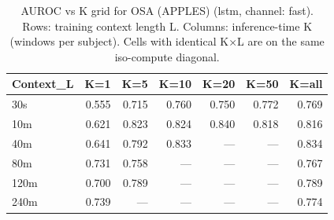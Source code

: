 \begin{table}[ht]
\centering
\caption{AUROC vs K grid for OSA (APPLES) (lstm, channel: fast). Rows: training context length L. Columns: inference-time K (windows per subject). Cells with identical K×L are on the same iso-compute diagonal.}
\label{tab:kgrid_osa_binary_apples_postqc_lstm_fast}
\begin{tabular}{lrrrrrr}
\toprule
Context_L & K=1 & K=5 & K=10 & K=20 & K=50 & K=all \\
\midrule
30s & 0.555 & 0.715 & 0.760 & 0.750 & 0.772 & 0.769 \\
10m & 0.621 & 0.823 & 0.824 & 0.840 & 0.818 & 0.816 \\
40m & 0.641 & 0.792 & 0.833 & — & — & 0.834 \\
80m & 0.731 & 0.758 & — & — & — & 0.767 \\
120m & 0.700 & 0.789 & — & — & — & 0.789 \\
240m & 0.739 & — & — & — & — & 0.774 \\
\bottomrule
\end{tabular}
\end{table}